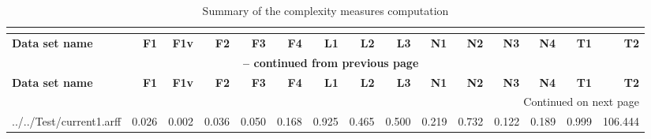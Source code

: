 \documentclass{article}
\begin{document}
\begin{center}
\footnotesize{             %
\setlength\LTleft{-100pt}  %

\begin{longtable}{lrrrrrrrrrrrrrr}

\caption[Complexity measures]{Summary of the complexity measures computation} \\
\label{tab:CMresults} \\
\hline
\textbf{Data set name} & \textbf{F1} & \textbf{F1v} & \textbf{F2} & \textbf{F3} & \textbf{F4} & \textbf{L1} & \textbf{L2} & \textbf{L3} & \textbf{N1} & \textbf{N2} & \textbf{N3} & \textbf{N4} & \textbf{T1} & \textbf{T2} \\
\hline
\hline
\endfirsthead

\multicolumn{15}{c}{{\bfseries \tablename\ \thetable{} -- continued from previous page}} \\
\hline
\textbf{Data set name} & \textbf{F1} & \textbf{F1v} & \textbf{F2} & \textbf{F3} & \textbf{F4} & \textbf{L1} & \textbf{L2} & \textbf{L3} & \textbf{N1} & \textbf{N2} & \textbf{N3} & \textbf{N4} & \textbf{T1} & \textbf{T2} \\
\hline
\hline
\endhead

\hline
\multicolumn{15}{r}{{Continued on next page}} \\
\hline
\endfoot

\hline
\hline
\endlastfoot

../../Test/current1.arff      & 0.026 & 0.002 & 0.036 & 0.050 & 0.168 & 0.925 & 0.465 & 0.500 & 0.219 & 0.732 & 0.122 & 0.189 & 0.999 & 106.444 \\
\hline

\end{longtable}

}
\end{center}
\end{document}
